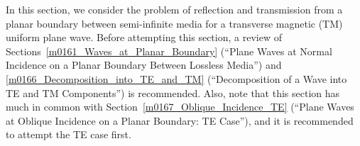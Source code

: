 

\label{m0164_Oblique_Incidence_TM} %

In this section, we consider the problem of reflection and transmission from a planar boundary between semi-infinite media for a transverse magnetic (TM) uniform plane wave.
Before attempting this section, a review of
Sections~\ref{m0161_Waves_at_Planar_Boundary} (``Plane Waves at Normal Incidence on a Planar Boundary Between Lossless Media'') and
\ref{m0166_Decomposition_into_TE_and_TM} (``Decomposition of a Wave into TE and TM Components'') is recommended.
Also, note that this section has much in common with Section~\ref{m0167_Oblique_Incidence_TE} (``Plane Waves at Oblique Incidence on a Planar Boundary: TE Case''), and it is recommended to attempt the TE case first.

